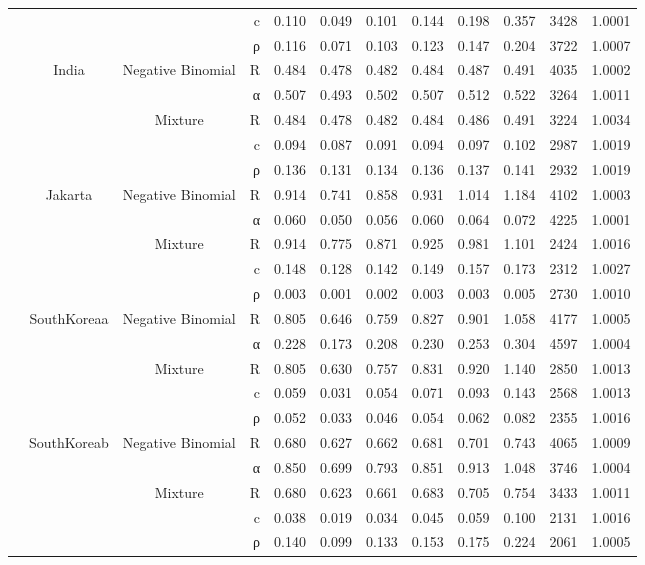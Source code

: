 \begin{table}[ht]
\begin{tabular}{lccrrrrrrrrr}
   &  &  & c & 0.110 & 0.049 & 0.101 & 0.144 & 0.198 & 0.357 & 3428 & 1.0001 \\ 
   &  &  & ρ & 0.116 & 0.071 & 0.103 & 0.123 & 0.147 & 0.204 & 3722 & 1.0007 \\ 
   & India & Negative Binomial & R & 0.484 & 0.478 & 0.482 & 0.484 & 0.487 & 0.491 & 4035 & 1.0002 \\ 
   &  &  & α & 0.507 & 0.493 & 0.502 & 0.507 & 0.512 & 0.522 & 3264 & 1.0011 \\ 
   &  & Mixture & R & 0.484 & 0.478 & 0.482 & 0.484 & 0.486 & 0.491 & 3224 & 1.0034 \\ 
   &  &  & c & 0.094 & 0.087 & 0.091 & 0.094 & 0.097 & 0.102 & 2987 & 1.0019 \\ 
   &  &  & ρ & 0.136 & 0.131 & 0.134 & 0.136 & 0.137 & 0.141 & 2932 & 1.0019 \\ 
   & Jakarta & Negative Binomial & R & 0.914 & 0.741 & 0.858 & 0.931 & 1.014 & 1.184 & 4102 & 1.0003 \\ 
   &  &  & α & 0.060 & 0.050 & 0.056 & 0.060 & 0.064 & 0.072 & 4225 & 1.0001 \\ 
   &  & Mixture & R & 0.914 & 0.775 & 0.871 & 0.925 & 0.981 & 1.101 & 2424 & 1.0016 \\ 
   &  &  & c & 0.148 & 0.128 & 0.142 & 0.149 & 0.157 & 0.173 & 2312 & 1.0027 \\ 
   &  &  & ρ & 0.003 & 0.001 & 0.002 & 0.003 & 0.003 & 0.005 & 2730 & 1.0010 \\ 
   & SouthKoreaa & Negative Binomial & R & 0.805 & 0.646 & 0.759 & 0.827 & 0.901 & 1.058 & 4177 & 1.0005 \\ 
   &  &  & α & 0.228 & 0.173 & 0.208 & 0.230 & 0.253 & 0.304 & 4597 & 1.0004 \\ 
   &  & Mixture & R & 0.805 & 0.630 & 0.757 & 0.831 & 0.920 & 1.140 & 2850 & 1.0013 \\ 
   &  &  & c & 0.059 & 0.031 & 0.054 & 0.071 & 0.093 & 0.143 & 2568 & 1.0013 \\ 
   &  &  & ρ & 0.052 & 0.033 & 0.046 & 0.054 & 0.062 & 0.082 & 2355 & 1.0016 \\ 
   & SouthKoreab & Negative Binomial & R & 0.680 & 0.627 & 0.662 & 0.681 & 0.701 & 0.743 & 4065 & 1.0009 \\ 
   &  &  & α & 0.850 & 0.699 & 0.793 & 0.851 & 0.913 & 1.048 & 3746 & 1.0004 \\ 
   &  & Mixture & R & 0.680 & 0.623 & 0.661 & 0.683 & 0.705 & 0.754 & 3433 & 1.0011 \\ 
   &  &  & c & 0.038 & 0.019 & 0.034 & 0.045 & 0.059 & 0.100 & 2131 & 1.0016 \\ 
   &  &  & ρ & 0.140 & 0.099 & 0.133 & 0.153 & 0.175 & 0.224 & 2061 & 1.0005 \\ 
   \hline
\end{tabular}
\end{table}

